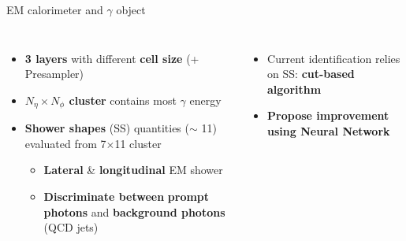 \begin{frame}{EM calorimeter and $\gamma$ object}
\begin{columns}
\begin{itemize}
    \item \textcolor{structurColor}{\textbf{3 layers}} with different \textbf{cell size} (+ Presampler)
    \item \textbf{$N_{\eta}\times N_{\phi}$ cluster} contains most $\gamma$ energy
    \pause
    \item \textcolor{HHturquoise_d}{\textbf{Shower shapes}} (SS) quantities ($\sim$ 11) evaluated from 7$\times$11 cluster
    \begin{itemize}
        \item \textbf{Lateral} \& \textbf{longitudinal} EM shower
        \item \textbf{Discriminate between} \textcolor{HHred}{\textbf{prompt photons}} and \textcolor{HHblue}{\textbf{background photons}} (QCD jets)
    \end{itemize}
\end{itemize}
\pause
\begin{itemize}
    \item Current identification relies on SS: \textbf{cut-based algorithm}
    \item \textcolor{HHred}{\textbf{Propose improvement using Neural Network}}
\end{itemize}
\end{columns} 
\end{frame}

